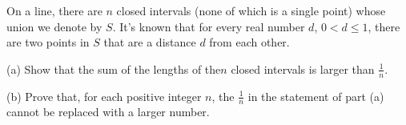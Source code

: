 On a line, there are $n$ closed intervals (none of which is a single point) whose union we denote by $S$. It's known that for every real number $d$,  $0<d\le 1$,  there are two points in $S$ that are a distance $d$ from each other.



(a) Show that the sum of the lengths of the$n$ closed intervals is larger than $\frac{1}{n}$.

(b) Prove that, for each positive integer $n$,  the $\frac{1}{n}$ in the statement of part (a) cannot be replaced with a larger number.